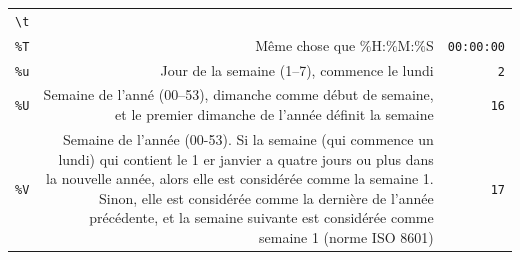 \documentclass[12pt,]{book}
\numberwithin{equation}{section}
\numberwithin{countremarque}{section}
\begin{document}
\begin{longtable}[]{@{}rrr@{}}
\begin{minipage}[t]{0.22\columnwidth}
\texttt{\textbackslash{}t}\strut
\end{minipage}\tabularnewline
\begin{minipage}[t]{0.10\columnwidth}\raggedleft\strut
\texttt{\%T}\strut
\end{minipage} & \begin{minipage}[t]{0.60\columnwidth}\raggedleft\strut
Même chose que \%H:\%M:\%S\strut
\end{minipage} & \begin{minipage}[t]{0.22\columnwidth}\raggedleft\strut
\texttt{00:00:00}\strut
\end{minipage}\tabularnewline
\begin{minipage}[t]{0.10\columnwidth}\raggedleft\strut
\texttt{\%u}\strut
\end{minipage} & \begin{minipage}[t]{0.60\columnwidth}\raggedleft\strut
Jour de la semaine (1--7), commence le lundi\strut
\end{minipage} & \begin{minipage}[t]{0.22\columnwidth}\raggedleft\strut
\texttt{2}\strut
\end{minipage}\tabularnewline
\begin{minipage}[t]{0.10\columnwidth}\raggedleft\strut
\texttt{\%U}\strut
\end{minipage} & \begin{minipage}[t]{0.60\columnwidth}\raggedleft\strut
Semaine de l'anné (00--53), dimanche comme début de semaine, et le
premier dimanche de l'année définit la semaine\strut
\end{minipage} & \begin{minipage}[t]{0.22\columnwidth}\raggedleft\strut
\texttt{16}\strut
\end{minipage}\tabularnewline
\begin{minipage}[t]{0.10\columnwidth}\raggedleft\strut
\texttt{\%V}\strut
\end{minipage} & \begin{minipage}[t]{0.60\columnwidth}\raggedleft\strut
Semaine de l'année (00-53). Si la semaine (qui commence un lundi) qui
contient le 1 er janvier a quatre jours ou plus dans la nouvelle année,
alors elle est considérée comme la semaine 1. Sinon, elle est considérée
comme la dernière de l'année précédente, et la semaine suivante est
considérée comme semaine 1 (norme ISO 8601)\strut
\end{minipage} & \begin{minipage}[t]{0.22\columnwidth}\raggedleft\strut
\texttt{17}\strut
\end{minipage}\tabularnewline

\end{longtable}
\end{document}
